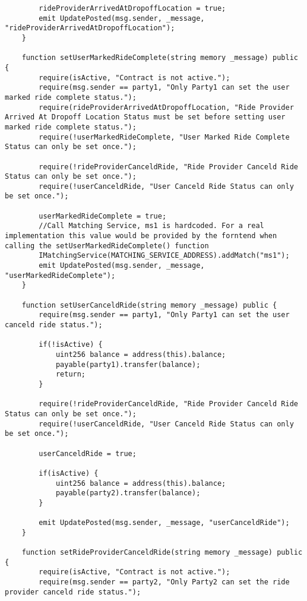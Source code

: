\begin{lstlisting}
        rideProviderArrivedAtDropoffLocation = true;
        emit UpdatePosted(msg.sender, _message, "rideProviderArrivedAtDropoffLocation");
    }

    function setUserMarkedRideComplete(string memory _message) public {
        require(isActive, "Contract is not active.");
        require(msg.sender == party1, "Only Party1 can set the user marked ride complete status.");
        require(rideProviderArrivedAtDropoffLocation, "Ride Provider Arrived At Dropoff Location Status must be set before setting user marked ride complete status.");
        require(!userMarkedRideComplete, "User Marked Ride Complete Status can only be set once.");

        require(!rideProviderCanceldRide, "Ride Provider Canceld Ride Status can only be set once.");
        require(!userCanceldRide, "User Canceld Ride Status can only be set once.");

        userMarkedRideComplete = true;
        //Call Matching Service, ms1 is hardcoded. For a real implementation this value would be provided by the forntend when calling the setUserMarkedRideComplete() function
        IMatchingService(MATCHING_SERVICE_ADDRESS).addMatch("ms1");
        emit UpdatePosted(msg.sender, _message, "userMarkedRideComplete");
    }

    function setUserCanceldRide(string memory _message) public {
        require(msg.sender == party1, "Only Party1 can set the user canceld ride status.");
        
        if(!isActive) {
            uint256 balance = address(this).balance;
            payable(party1).transfer(balance);
            return;
        }

        require(!rideProviderCanceldRide, "Ride Provider Canceld Ride Status can only be set once.");
        require(!userCanceldRide, "User Canceld Ride Status can only be set once.");

        userCanceldRide = true;
        
        if(isActive) {
            uint256 balance = address(this).balance;
            payable(party2).transfer(balance);
        }
        
        emit UpdatePosted(msg.sender, _message, "userCanceldRide");
    }

    function setRideProviderCanceldRide(string memory _message) public {
        require(isActive, "Contract is not active.");
        require(msg.sender == party2, "Only Party2 can set the ride provider canceld ride status.");
        

\end{lstlisting}
